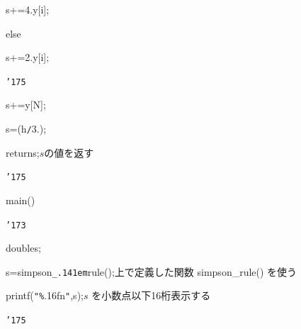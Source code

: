 \documentclass{article}
\begin{document}
\noindent
\mbox{}{\tt\mc {}\charwd}{\tt\mc {}\charwd}s{\tt\mc {}\charwd}+={\tt\mc {}\charwd}4.{\tt\mc {}\charwd}{\tt *}{\tt\mc {}\charwd}y[i];

\noindent
\mbox{}{\tt\mc {}\charwd}else

\noindent
\mbox{}{\tt\mc {}\charwd}{\tt\mc {}\charwd}s{\tt\mc {}\charwd}+={\tt\mc {}\charwd}2.{\tt\mc {}\charwd}{\tt *}{\tt\mc {}\charwd}y[i];

\noindent
\mbox{}{\tt\mc {}\charwd}{\tt\char'175}

\noindent
\mbox{}{\tt\mc {}\charwd}s{\tt\mc {}\charwd}+={\tt\mc {}\charwd}y[N];

\noindent
\mbox{}{\tt\mc {}\charwd}s{\tt\mc {}\charwd}{\tt *}={\tt\mc {}\charwd}(h{\tt\mc {}\charwd}{\tt /}{\tt\mc {}\charwd}3.);

\noindent
\mbox{}{\tt\mc {}\charwd}return{\tt\mc {}\charwd}s;{\tt\mc {}\charwd}{\tt\mc {}\charwd}{\tt\mc {}\charwd}{\tt\mc {}\charwd}\rm\mc {\tt /}{\tt *}\charwd $s$\rm\mc {}\charwd の値を返す\charwd  \hfill \rm\mc {}\charwd {\tt *}{\tt /}
\tt\mc 

\noindent
\mbox{}{\tt\char'175}

\noindent
\mbox{}\hfill

\noindent
\mbox{}main()

\noindent
\mbox{}{\tt\char'173}

\noindent
\mbox{}{\tt\mc {}\charwd}double{\tt\mc {}\charwd}s;

\noindent
\mbox{}\hfill

\noindent
\mbox{}{\tt\mc {}\charwd}s{\tt\mc {}\charwd}={\tt\mc {}\charwd}simpson{\tt\_\kern.141em}rule();{\tt\mc {}\charwd}{\tt\mc {}\charwd}{\tt\mc {}\charwd}\rm\mc {\tt /}{\tt *}\charwd  {}上で定義した関数
					   simpson\_rule() を使う \hfill \rm\mc {}\charwd {\tt *}{\tt /}
\tt\mc 

\noindent
\mbox{}{\tt\mc {}\charwd}printf({\tt "}{\tt\%}.16f{\tt{}}n{\tt "},{\tt\mc {}\charwd}s);{\tt\mc {}\charwd}{\tt\mc {}\charwd}\rm\mc {\tt /}{\tt *}\charwd  {}$s$ を小数点以下16桁表示する
					 \hfill \rm\mc {}\charwd {\tt *}{\tt /}
\tt\mc 

\noindent
\mbox{}{\tt\char'175}

\noindent
\mbox{}

\rm\mc
\end{document}

